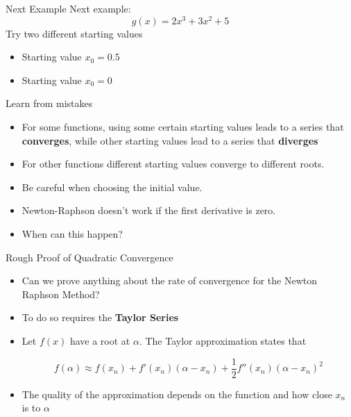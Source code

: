 \documentclass[10pt]{beamer}
\begin{document}
\begin{frame}{Next Example}
  Next example:
  \begin{equation}
    g(x)=2x^3+3x^2+5
  \end{equation}
  Try two different starting values
  \begin{itemize}
  \item Starting value $x_0=0.5$
  \item Starting value $x_0=0$
  \end{itemize}
\end{frame}

\begin{frame}{Learn from mistakes}
  \begin{itemize}
  \item For some functions, using some certain starting values leads to a series that {\bf converges}, while other starting values lead to a series that {\bf diverges}

  \item For other functions different starting values converge to different roots.

  \item Be careful when choosing the initial value.

  \item Newton-Raphson doesn't work if the first derivative is zero.

  \item When can this happen?
  \end{itemize}
\end{frame}
\begin{frame}{Rough Proof of Quadratic Convergence}
  \begin{itemize}
  \item Can we prove anything about the rate of convergence for the Newton Raphson Method?

  \item To do so requires the {\bf Taylor Series}

  \item Let $f(x)$ have a root at $\alpha$.   The Taylor approximation states that

    \begin{equation}
      f(\alpha)\approx f(x_n)+f'(x_n)(\alpha-x_n)+\frac{1}{2}f''(x_n)(\alpha-x_n)^2
    \end{equation}

  \item The quality of the approximation depends on the function and how close $x_n$ is to $\alpha$
  \end{itemize}
\end{frame}
\end{document}

